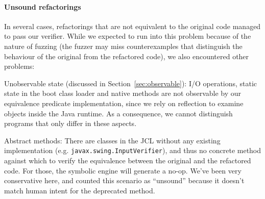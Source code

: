 \documentclass[sigconf,review,anonymous]{acmart}
\begin{document}
\paragraph{Unsound refactorings}
%
%
In several cases, refactorings that are not equivalent to the original code managed to pass our verifier.
While we expected to run into this problem because of the nature of fuzzing (the fuzzer may miss counterexamples that distinguish the behaviour of the original from the refactored code),
we also encountered other problems:


Unobservable state (discussed in Section~\ref{sec:observable}): I/O operations, static state in the boot class loader and
native methods are not observable by our equivalence predicate implementation,
since we rely on reflection to examine objects inside the Java runtime. As
a consequence, we cannot distinguish programs that only differ in these aspects.

Abstract methods: 
There are classes in the JCL without any
existing implementation (e.g. \lstinline{javax.swing.InputVerifier}), and thus no concrete
method against which to verify the equivalence between the original and the refactored code. For those, the symbolic engine will
generate a no-op. We've been very conservative here, and counted this scenario as ``unsound'' because
it doesn't match human intent for the deprecated method.
\end{document}
